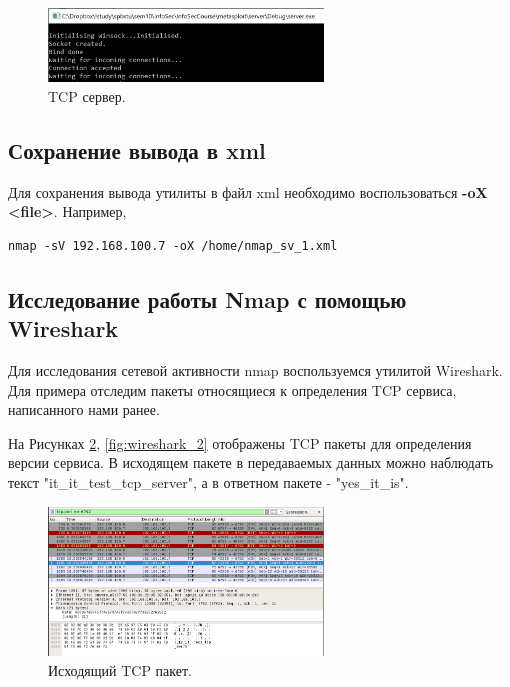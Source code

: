 \documentclass[10pt,a4paper]{article}
\begin{document}
\begin{figure}[h]
\begin{center}
\includegraphics[width=0.65\textwidth]{tcp_server}
\caption{TCP сервер.}
\label{fig:tcp_server}
\end{center}
\end{figure}

\subsection{Сохранение вывода в xml}
\label{xml_output}

Для сохранения вывода утилиты в файл xml необходимо воспользоваться \textbf{-oX <file>}. Например,
\begin{verbatim}
nmap -sV 192.168.100.7 -oX /home/nmap_sv_1.xml
\end{verbatim}

\subsection{Исследование работы Nmap с помощью Wireshark}
\label{wireshark}

Для исследования сетевой активности nmap воспользуемся утилитой Wireshark. Для примера отследим пакеты относящиеся к определения TCP сервиса, написанного нами ранее.

На Рисунках \ref{fig:wireshark_1}, \ref{fig:wireshark_2} отображены TCP пакеты для определения версии сервиса. В исходящем пакете в передаваемых данных можно наблюдать текст "it\_it\_test\_tcp\_server", а в ответном пакете - "yes\_it\_is".

\begin{figure}[h]
\begin{center}
\includegraphics[width=0.65\textwidth]{wireshark_1}
\caption{Исходящий TCP пакет.}
\label{fig:wireshark_1}
\end{center}
\end{figure}
\end{document}
